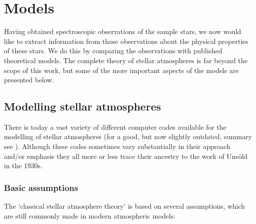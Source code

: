 \chapter{Models}
\label{ch:mod}

Having obtained spectroscopic observations of the sample stars, we now
would like to extract information from those observations about the
physical properties of these stars. We do this by comparing the
observations with published theoretical models. The complete theory of
stellar atmospheres is far beyond the scope of this work, but some of
the more important aspects of the models are presented below.

\section{Modelling stellar atmospheres}

There is today a vast variety of different computer codes available
for the modelling of stellar atmospheres (for a good, but now slightly
outdated, summary see \cite{hu:91}). Although these codes sometimes
vary substantially in their approach and/or emphasis they all more or
less trace their ancestry to the work of Uns\"old in the 1930s.

\subsection{Basic assumptions}
The `classical stellar atmosphere theory' is based on several
assumptions, which are still commonly made in modern atmospheric
models:

